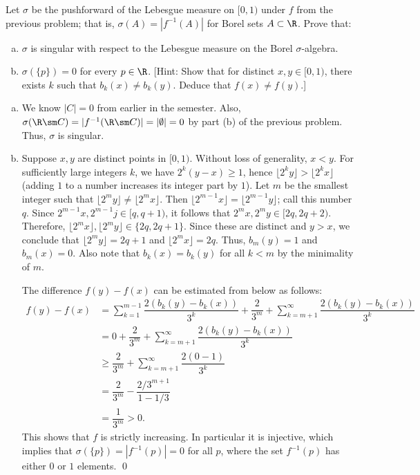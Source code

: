 \begin{hwsol}
Let $\sigma$ be the pushforward of the Lebesgue measure on $[0, 1)$ under $f$ from the previous problem; that is, $\sigma(A)= |f^{-1}(A)|$ for Borel sets $A  \subset \R$. Prove that: \hfill
	\begin{enumerate}[(a)]
	\item $\sigma$ is singular with respect to the Lebesgue measure on the Borel $\sigma$-algebra. 
	\item $\sigma(\{ p \})= 0$ for every $p \in \R$. [Hint: Show that for distinct $x,y \in [0, 1)$, there exists $k$ such that $b_k(x) \neq b_k(y)$. Deduce that $f(x) \neq f(y)$.]
	\end{enumerate}

\pf \hfill
\begin{enumerate}[(a)]
\item We know $|C|= 0$ from earlier in the semester. Also, $\sigma( \R \sm C)= |f^{-1}( \R  \sm C)|= |\emptyset|= 0$ by part (b) of the previous problem. Thus, $\sigma$ is singular.

\item Suppose $x,y$ are distinct points in $[0,1)$. Without loss of generality, $x<y$. For sufficiently large integers $k$, we have $2^k (y-x) \geq 1$, hence $\lfloor 2^k y \rfloor > \lfloor 2^k x \rfloor$ (adding $1$ to a number increases its integer part by $1$). Let $m$ be the smallest integer such that $\lfloor 2^m y\rfloor \neq \lfloor 2^m x \rfloor$. Then $\lfloor 2^{m-1}x \rfloor= \lfloor 2^{m-1} y \rfloor$; call this number $q$. Since $2^{m-1} x, 2^{m-1} j \in [q, q+1)$, it follows that $2^m x, 2^m y \in [2q, 2q+2)$. Therefore, 
$\lfloor 2^m x \rfloor, \lfloor 2^m y \rfloor \in \{2q, 2q+1\}$. Since these are distinct and $y > x$, we conclude that $\lfloor 2^m y \rfloor= 2q+1$ and $\lfloor 2^m x \rfloor= 2q$. Thus, $b_m(y)= 1$ and $b_m(x)= 0$. Also note that $b_k(x)= b_k(y)$ for all $k < m$ by the minimality of $m$. 

The difference $f(y)-f(x)$ can be estimated from below as follows: 
        \[
        \begin{split}
        f(y)-f(x)&= \sum_{k=1}^{m-1} \dfrac{ 2 (b_k(y) - b_k(x))}{3^k} + \dfrac{2}{3^m} + \sum_{k=m+1}^{\infty} \dfrac{2 (b_k(y) - b_k(x))}{3^k} \\ 
        &= 0 + \dfrac{2}{3^m} + \sum_{k=m+1}^{\infty} \dfrac{2 (b_k(y) - b_k(x))}{3^k} \\ 
        &\geq \dfrac{2}{3^m} + \sum_{k=m+1}^{\infty} \dfrac{2 (0 - 1)}{3^k} \\ 
        &= \dfrac{2}{3^m} - \dfrac{2/3^{m+1}}{1 - 1/3} \\ 
        &= \dfrac{1}{3^m} > 0.
        \end{split}\]
This shows that $f$ is strictly increasing. In particular it is injective, which implies that $\sigma(\{ p \})= |f^{-1}(p)|= 0$ for all $p$, where the set  $f^{-1}(p)$ has either $0$ or $1$ elements. \qed \\
\end{enumerate}
\end{hwsol}

